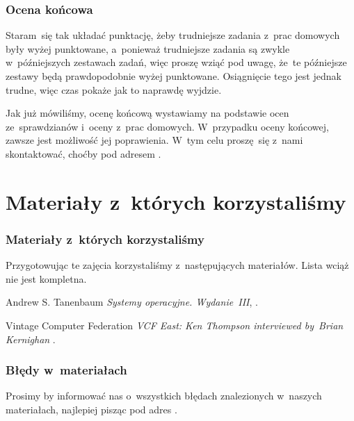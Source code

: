 \documentclass[10pt,t]{beamer}
\begin{document}
\begin{frame}
  \frametitle{Ocena końcowa}


  Staram~się tak układać punktację, żeby trudniejsze zadania z~prac
  domowych były wyżej punktowane, a~ponieważ trudniejsze zadania są zwykle
  w~późniejszych zestawach zadań, więc proszę wziąć pod uwagę, że~te
  późniejsze zestawy będą prawdopodobnie wyżej punktowane. Osiągnięcie
  tego jest jednak trudne, więc czas pokaże jak to naprawdę wyjdzie.

  Jak już mówiliśmy, ocenę końcową wystawiamy na podstawie ocen
  ze~sprawdzianów i~oceny z~prac domowych. W~przypadku oceny końcowej,
  zawsze jest możliwość jej poprawienia. W~tym celu proszę~się z~nami
  skontaktować, choćby pod adresem \email.

\end{frame}










\section{Materiały z~których korzystaliśmy}


\begin{frame}
  \frametitle{Materiały z~których korzystaliśmy}


  Przygotowując te zajęcia korzystaliśmy z~następujących materiałów.
  \alert{Lista wciąż nie jest kompletna.}

  Andrew S. Tanenbaum \textit{Systemy operacyjne. Wydanie~III},
  \parencite{Tanenbaum-Systemy-operacyjne-Wydanie-III-Pub-2013}.

  Vintage Computer Federation \textit{VCF East: Ken Thompson interviewed
    by~Brian Kernighan} \parencite{VCF-VCF-East-Ken-Thompson-interviewed-by-Brian-ETC-Ver-2019}.


\end{frame}





\begin{frame}
  \frametitle{Błędy w~materiałach}


  Prosimy by informować nas o~wszystkich błędach znalezionych w~naszych
  materiałach, najlepiej pisząc pod adres \email.

\end{frame}
\end{document}
